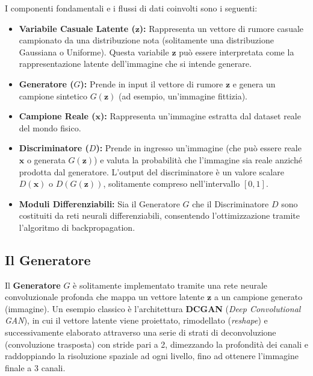﻿\documentclass[11pt, a4paper]{article}
\begin{document}

I componenti fondamentali e i flussi di dati coinvolti sono i seguenti:
\begin{itemize}
    \item \textbf{Variabile Casuale Latente ($\bm{z}$):} Rappresenta un vettore di rumore casuale campionato da una distribuzione nota (solitamente una distribuzione Gaussiana o Uniforme). Questa variabile $\bm{z}$ può essere interpretata come la rappresentazione latente dell'immagine che si intende generare.
    \item \textbf{Generatore ($G$):} Prende in input il vettore di rumore $\bm{z}$ e genera un campione sintetico $G(\bm{z})$ (ad esempio, un'immagine fittizia).
    \item \textbf{Campione Reale ($\bm{x}$):} Rappresenta un'immagine estratta dal dataset reale del mondo fisico.
    \item \textbf{Discriminatore ($D$):} Prende in ingresso un'immagine (che può essere reale $\bm{x}$ o generata $G(\bm{z})$) e valuta la probabilità che l'immagine sia reale anziché prodotta dal generatore. L'output del discriminatore è un valore scalare $D(\bm{x})$ o $D(G(\bm{z}))$, solitamente compreso nell'intervallo $[0, 1]$.
    \item \textbf{Moduli Differenziabili:} Sia il Generatore $G$ che il Discriminatore $D$ sono costituiti da reti neurali differenziabili, consentendo l'ottimizzazione tramite l'algoritmo di backpropagation.
\end{itemize}

\subsection{Il Generatore}

Il \textbf{Generatore} $G$ è solitamente implementato tramite una rete neurale convoluzionale profonda che mappa un vettore latente $\bm{z}$ a un campione generato (immagine). Un esempio classico è l'architettura \textbf{DCGAN} (\emph{Deep Convolutional GAN}), in cui il vettore latente viene proiettato, rimodellato (\emph{reshape}) e successivamente elaborato attraverso una serie di strati di deconvoluzione (convoluzione trasposta) con stride pari a 2, dimezzando la profondità dei canali e raddoppiando la risoluzione spaziale ad ogni livello, fino ad ottenere l'immagine finale a 3 canali.
\end{document}
